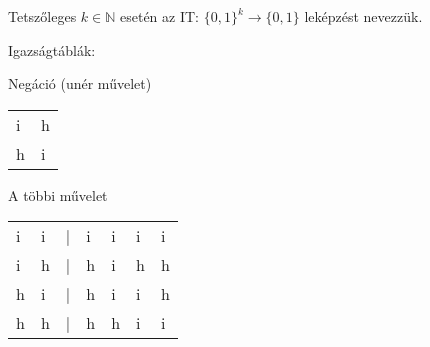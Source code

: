 \begin{frame}
\begin{tcolorbox}[title={K változós igazságtábla}]
Tetszőleges $k \in \mathbb{N}$ esetén az IT: $\{0, 1\}^k \rightarrow \{0, 1\}$ leképzést  nevezzük.
\end{tcolorbox}

\begin{block}{Igazságtáblák:}
\begin{table}[h!]
\centering
Negáció (unér művelet)\\
\mbigskip
\begin{tabular}{@{}C{3em}C{3em}@{}}
\toprule
{} &  \\
\hline
i & h\\
\hdashline
h & i\\
\toprule
\end{tabular}
\end{table}
\mbigskip

\begin{table}[h!]
\centering
A többi művelet\\
\mbigskip
\begin{tabular}{C{1em}C{1em}rC{4.4em}C{4.4em}C{4.4em}C{4.6em}}
\toprule
{} &  & \textBF{$|$} &  &  &  &  \\
\hline
i & i & | & i & i & i & i\\
\hdashline
i & h & | & h & i & h & h\\
\hdashline
h & i & | & h & i & i & h\\
\hdashline
h & h & | & h & h & i & i\\
\toprule
\end{tabular}
\end{table}
\end{block}

\end{frame}


